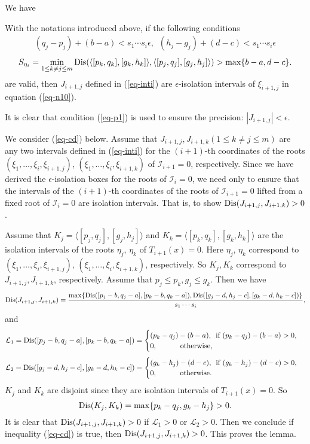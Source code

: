 \documentclass[amsthm]{JSC_LaTex_2007_Mar_12/elsart}
\def\bref#1{(\ref{#1})}
\def\IS{{\mathcal{I}}}
\def\Dis{\hbox{\rm{Dis}}}
\begin{document}
We have
\begin{lem}With the notations introduced above, if the following
conditions
\begin{eqnarray}\label{eq-p1} (q_j-p_j)+(b-a)<s_1\cdots s_i\epsilon,\,\,\, (h_j-g_j)+(d-c)<s_1\cdots s_i\epsilon\end{eqnarray}
\begin{equation}\label{eq-cd}
S_{\eta_i}=\min\limits_{1\le k\neq j\le
m}\Dis(\langle[p_k,q_k],[g_k,h_k]\rangle,\langle[p_j,q_j],[g_j,h_j]\rangle)>\max\{b-a,d-c\}.
\end{equation}
are valid, then $J_{i+1,j}$ defined in \bref{eq-inti} are
$\epsilon$-isolation intervals of $\xi_{i+1,j}$ in equation \bref
{eq-n10}.
\end{lem}
\begin{pf}
It is clear that condition \bref{eq-p1} is used to ensure the
precision: $|J_{i+1,j}| < \epsilon$.

We consider \bref{eq-cd} below. Assume that $J_{i+1,j}, J_{i+1,k}
(1\le k\neq j\le m)$ are any two intervals defined in \bref{eq-inti}
for the $(i+1)$-th coordinates of the roots
$(\xi_1,\ldots,\xi_i,\xi_{i+1,j})$,
$(\xi_1,\ldots,\xi_i,\xi_{i+1,k})$ of $\IS_{i+1}=0$, respectively.
Since we have derived the $\epsilon$-isolation boxes for the roots
of $\IS_i=0$, we need only to ensure that the intervals of the
$(i+1)$-th coordinates of the roots of $\IS_{i+1}=0$ lifted from a
fixed root of $\IS_{i}=0$ are isolation intervals. That is, to show
$\Dis(J_{i+1,j},J_{i+1,k})>0$.

Assume that $K_j=\langle[p_j,q_j],[g_j,h_j]\rangle$ and
$K_k=\langle[p_k,q_k],[g_k,h_k]\rangle$ are the isolation intervals
of the roots $\eta_j$, $\eta_k$ of $T_{i+1}(x)=0$. Here $\eta_j$,
$\eta_k$ correspond to $(\xi_1,\ldots,\xi_i,\xi_{i+1,j})$,
$(\xi_1,\ldots,\xi_i,\xi_{i+1,k})$, respectively. So $K_j,K_k$
correspond to $J_{i+1,j},J_{i+1,k}$, respectively. Assume that
$p_j\le p_k,g_j\le g_k$. Then we have {\small
$$\Dis(J_{i+1,j},J_{i+1,k})=\frac{\max\{\Dis([p_j-b,q_j-a],[p_k-b,q_k-a]),\Dis([g_j-d,h_j-c],[g_k-d,h_k-c])\}}{s_1\cdots
s_i},$$} and
$$\mathcal{L}_1=\Dis([p_j-b,q_j-a],[p_k-b,q_k-a])=
\begin{cases}
(p_k-q_j)-(b-a), \,\hbox{ if } (p_k-q_j)-(b-a)>0,\\
0, \hspace{1cm}\hbox{        otherwise},
\end{cases}
$$
$$\mathcal{L}_2=\Dis([g_j-d,h_j-c],[g_k-d,h_k-c])=
\begin{cases}
(g_k-h_j)-(d-c), \,\hbox{ if } (g_k-h_j)-(d-c)>0,\\
0, \hspace{1cm}\hbox{        otherwise}.
\end{cases}
$$
$K_j$ and $K_k$ are disjoint since they are isolation intervals of
$T_{i+1}(x)=0$. So
$$\Dis(K_j,K_k)=\max\{p_k-q_j,g_k-h_j\}>0.$$
It is clear that $\Dis(J_{i+1,j},J_{i+1,k})>0$ if $\mathcal{L}_1>0$ or $\mathcal{L}_2>0$.
Then we conclude if inequality \bref{eq-cd} is true, then
$\Dis(J_{i+1,j},J_{i+1,k})>0$. This proves the lemma.
\end{pf}
\end{document}
